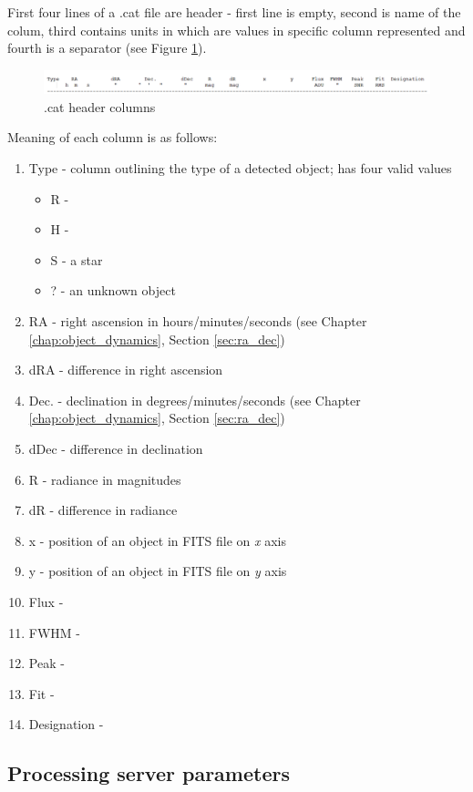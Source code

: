 	First four lines of a .cat file are header - first line is empty, second is name of the colum, third contains units in which are values in specific column represented and fourth is a separator (see Figure \ref{fig:cat_header}).
	
	\begin{figure}[H]
	  \includegraphics[width=\linewidth]{images/cat_columns}
		  \caption{.cat header columns}
	  \label{fig:cat_header}
	\end{figure}
	
	Meaning of each column is as follows:
	
	\begin{enumerate}
		\item Type - column outlining the type of a detected object; has four valid values
		\begin{itemize}
			\item R - 
			\item H - 
			\item S - a star
			\item ? - an unknown object
		\end{itemize}
		\item RA - right ascension in hours/minutes/seconds (see Chapter \ref{chap:object_dynamics}, Section \ref{sec:ra_dec})
		\item dRA - difference in right ascension
		\item Dec. - declination in degrees/minutes/seconds (see Chapter \ref{chap:object_dynamics}, Section \ref{sec:ra_dec})
		\item dDec - difference in declination
		\item R - radiance in magnitudes
		\item dR - difference in radiance
		\item x - position of an object in FITS file on \emph{x} axis
		\item y - position of an object in FITS file on \emph{y} axis
		\item Flux - 
		\item FWHM - 
		\item Peak - 
		\item Fit - 
		\item Designation - 
	\end{enumerate}
	
\subsection{Processing server parameters}\label{sec:server_param}

